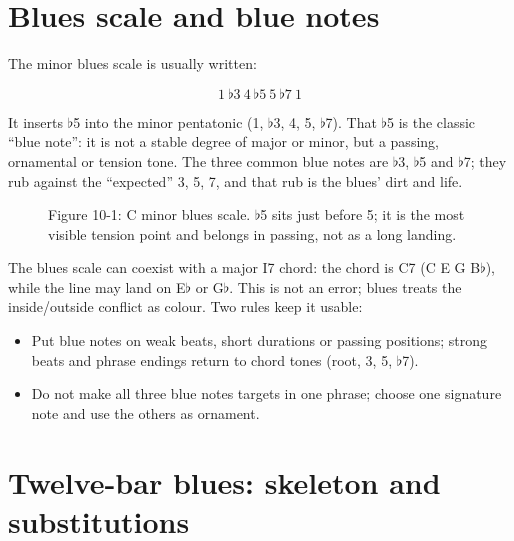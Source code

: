 \section{Blues scale and blue notes}

The minor blues scale is usually written:

\[
\mathrm{1\ \flat3\ 4\ \flat5\ 5\ \flat7\ 1}
\]

It inserts \(\flat\)5 into the minor pentatonic (1, \(\flat\)3, 4, 5, \(\flat\)7). That \(\flat\)5 is the classic ``blue note'': it is not a stable degree of major or minor, but a passing, ornamental or tension tone. The three common blue notes are \(\flat\)3, \(\flat\)5 and \(\flat\)7; they rub against the ``expected'' 3, 5, 7, and that rub is the blues' dirt and life.

\begin{figure}[htbp]
\centering
{}
\caption*{Figure 10-1: C minor blues scale. \(\flat\)5 sits just before 5; it is the most visible tension point and belongs in passing, not as a long landing.}
\end{figure}

The blues scale can coexist with a major I7 chord: the chord is C7 (C E G B\(\flat\)), while the line may land on E\(\flat\) or G\(\flat\). This is not an error; blues treats the inside/outside conflict as colour. Two rules keep it usable:

\begin{itemize}
  \item Put blue notes on weak beats, short durations or passing positions; strong beats and phrase endings return to chord tones (root, 3, 5, \(\flat\)7).
  \item Do not make all three blue notes targets in one phrase; choose one signature note and use the others as ornament.
\end{itemize}

\section{Twelve-bar blues: skeleton and substitutions}

